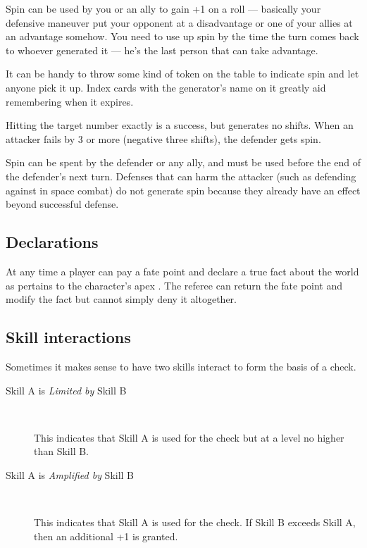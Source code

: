 Spin can be used by you or an ally to gain +1 on a roll --- basically your 
defensive maneuver put your opponent at a disadvantage or one of your allies at 
an advantage somehow. You need to use up spin by the time the turn comes back 
to whoever generated it --- he's the last person that can take advantage.

It can be handy to throw some kind of token on the table to indicate spin and 
let anyone pick it up. Index cards with the generator's name on it greatly aid 
remembering when it expires.

Hitting the target number exactly is a success, but generates no shifts. When an attacker fails by 3 or more (negative three shifts), the defender gets spin.

Spin can be spent by the defender or any ally, and must be used before the end of the defender's next turn. Defenses that can harm the attacker (such as defending against  in space combat) do not generate spin because they already have an effect beyond successful defense.

\subsection{Declarations}
\label{sec:declarations}

At any time a player can pay a fate point and declare a true fact about the world as pertains to the character's apex \Skill. The referee can return the fate point and modify the fact but cannot simply deny it altogether.

\subsection{Skill interactions}\label{sec:skill-interactions} %

Sometimes it makes sense to have two skills interact to form the basis of a
check.
\begin{description}
\item[Skill A is \emph{Limited by} Skill B]~

This indicates that Skill A is used for the check but at a level no
higher than Skill B.
\item[Skill A is \emph{Amplified by} Skill B]~

This indicates that Skill A is used for the check. If Skill B exceeds Skill
A, then an additional +1 is granted.
\end{description}

